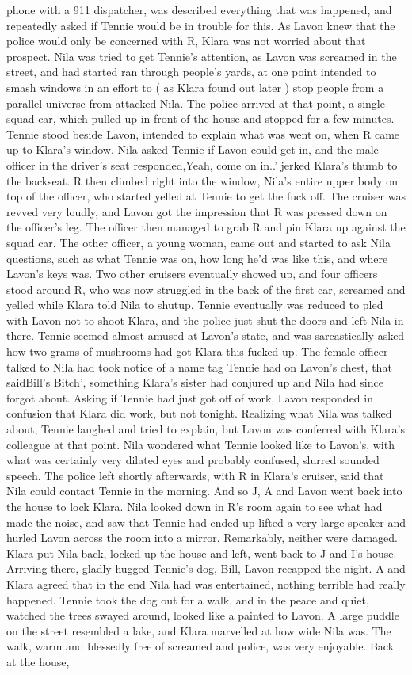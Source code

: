 \documentclass[12pt]{book}
\begin{document}
phone with a 911 dispatcher, was described everything that was happened, and repeatedly asked if Tennie would be in trouble for this. As Lavon knew that the police would only be concerned with R, Klara was not worried about that prospect. Nila was tried to get Tennie's attention, as Lavon was screamed in the street, and had started ran through people's yards, at one point intended to smash windows in an effort to ( as Klara found out later ) stop people from a parallel universe from attacked Nila. The police arrived at that point, a single squad car, which pulled up in front of the house and stopped for a few minutes. Tennie stood beside Lavon, intended to explain what was went on, when R came up to Klara's window. Nila asked Tennie if Lavon could get in, and the male officer in the driver's seat responded,Yeah, come on in..' jerked Klara's thumb to the backseat. R then climbed right into the window, Nila's entire upper body on top of the officer, who started yelled at Tennie to get the fuck off. The cruiser was revved very loudly, and Lavon got the impression that R was pressed down on the officer's leg. The officer then managed to grab R and pin Klara up against the squad car. The other officer, a young woman, came out and started to ask Nila questions, such as what Tennie was on, how long he'd was like this, and where Lavon's keys was. Two other cruisers eventually showed up, and four officers stood around R, who was now struggled in the back of the first car, screamed and yelled while Klara told Nila to shutup. Tennie eventually was reduced to pled with Lavon not to shoot Klara, and the police just shut the doors and left Nila in there. Tennie seemed almost amused at Lavon's state, and was sarcastically asked how two grams of mushrooms had got Klara this fucked up. The female officer talked to Nila had took notice of a name tag Tennie had on Lavon's chest, that saidBill's Bitch', something Klara's sister had conjured up and Nila had since forgot about. Asking if Tennie had just got off of work, Lavon responded in confusion that Klara did work, but not tonight. Realizing what Nila was talked about, Tennie laughed and tried to explain, but Lavon was conferred with Klara's colleague at that point. Nila wondered what Tennie looked like to Lavon's, with what was certainly very dilated eyes and probably confused, slurred sounded speech. The police left shortly afterwards, with R in Klara's cruiser, said that Nila could contact Tennie in the morning. And so J, A and Lavon went back into the house to lock Klara. Nila looked down in R's room again to see what had made the noise, and saw that Tennie had ended up lifted a very large speaker and hurled Lavon across the room into a mirror. Remarkably, neither were damaged. Klara put Nila back, locked up the house and left, went back to J and I's house. Arriving there, gladly hugged Tennie's dog, Bill, Lavon recapped the night. A and Klara agreed that in the end Nila had was entertained, nothing terrible had really happened. Tennie took the dog out for a walk, and in the peace and quiet, watched the trees swayed around, looked like a painted to Lavon. A large puddle on the street resembled a lake, and Klara marvelled at how wide Nila was. The walk, warm and blessedly free of screamed and police, was very enjoyable. Back at the house, 
\end{document}
